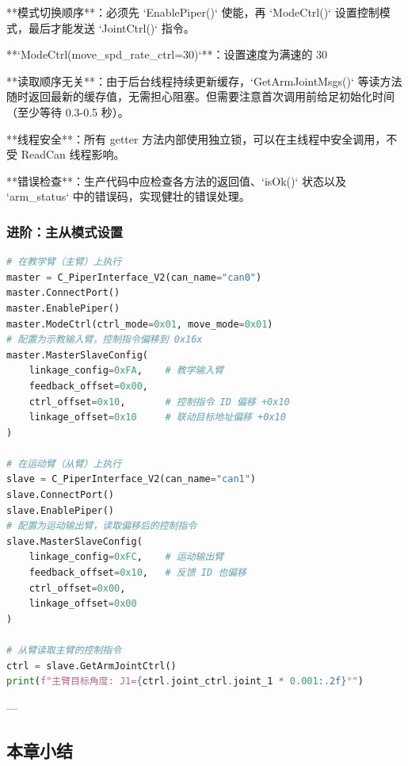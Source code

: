 \documentclass[UTF8,a4paper,11pt]{ctexart}
\begin{document}
\item[2] **模式切换顺序**：必须先 `EnablePiper()` 使能，再 `ModeCtrl()` 设置控制模式，最后才能发送 `JointCtrl()` 指令。

\item[3] **`ModeCtrl(move_spd_rate_ctrl=30)`**：设置速度为满速的 30%

\item[4] **读取顺序无关**：由于后台线程持续更新缓存，`GetArmJointMsgs()` 等读方法随时返回最新的缓存值，无需担心阻塞。但需要注意首次调用前给足初始化时间（至少等待 0.3-0.5 秒）。

\item[5] **线程安全**：所有 getter 方法内部使用独立锁，可以在主线程中安全调用，不受 ReadCan 线程影响。

\item[6] **错误检查**：生产代码中应检查各方法的返回值、`isOk()` 状态以及 `arm_status` 中的错误码，实现健壮的错误处理。

\subsubsection{进阶：主从模式设置}

\begin{lstlisting}[language=python]
# 在教学臂（主臂）上执行
master = C_PiperInterface_V2(can_name="can0")
master.ConnectPort()
master.EnablePiper()
master.ModeCtrl(ctrl_mode=0x01, move_mode=0x01)
# 配置为示教输入臂，控制指令偏移到 0x16x
master.MasterSlaveConfig(
    linkage_config=0xFA,    # 教学输入臂
    feedback_offset=0x00,
    ctrl_offset=0x10,       # 控制指令 ID 偏移 +0x10
    linkage_offset=0x10     # 联动目标地址偏移 +0x10
)

# 在运动臂（从臂）上执行
slave = C_PiperInterface_V2(can_name="can1")
slave.ConnectPort()
slave.EnablePiper()
# 配置为运动输出臂，读取偏移后的控制指令
slave.MasterSlaveConfig(
    linkage_config=0xFC,    # 运动输出臂
    feedback_offset=0x10,   # 反馈 ID 也偏移
    ctrl_offset=0x00,
    linkage_offset=0x00
)

# 从臂读取主臂的控制指令
ctrl = slave.GetArmJointCtrl()
print(f"主臂目标角度: J1={ctrl.joint_ctrl.joint_1 * 0.001:.2f}°")
\end{lstlisting}

---

\subsection{本章小结}
\end{document}
